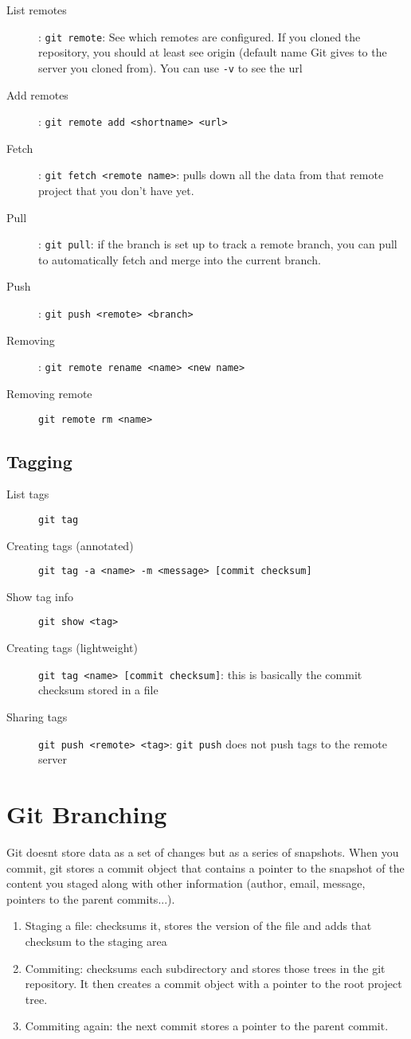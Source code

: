 \documentclass[french]{article}
\begin{document}
\begin{description}
    \item[List remotes]: \lstinline{git remote}: See which remotes are configured. If you cloned the repository, you should at least see origin (default name Git gives to the server you cloned from). You can use \lstinline{-v} to see the url
    \item[Add remotes]: \lstinline{git remote add <shortname> <url>}
    \item[Fetch]: \lstinline{git fetch <remote name>}: pulls down all the data from that remote project that you don't have yet.
    \item[Pull]: \lstinline{git pull}: if the branch is set up to track a remote branch, you can pull to automatically fetch and merge into the current branch.
    \item[Push]: \lstinline{git push <remote> <branch>}
    \item[Removing]: \lstinline{git remote rename <name> <new name>}
    \item[Removing remote] \lstinline{git remote rm <name>}
\end{description}

\subsection{Tagging}

\begin{description}
    \item[List tags] \lstinline{git tag}
    \item[Creating tags (annotated)] \lstinline{git tag -a <name> -m <message> [commit checksum]}
    \item[Show tag info] \lstinline{git show <tag>}
    \item[Creating tags (lightweight)] \lstinline{git tag <name> [commit checksum]}: this is basically the commit checksum stored in a file
    \item[Sharing tags] \lstinline{git push <remote> <tag>}: \lstinline{git push} does not push tags to the remote server
\end{description}

\section{Git Branching}
Git doesnt store data as a set of changes but as a series of snapshots. When you commit, git stores a commit object that contains a pointer to the snapshot of the content you staged along with other information (author, email, message, pointers to the parent commits...).\\
\begin{enumerate}
  \item Staging a file: checksums it, stores the version of the file and adds that checksum to the staging area
  \item Commiting: checksums each subdirectory and stores those trees in the git repository. It then creates a commit object with a pointer to the root project tree.
  \item Commiting again: the next commit stores a pointer to the parent commit.
\end{enumerate}
\end{document}
